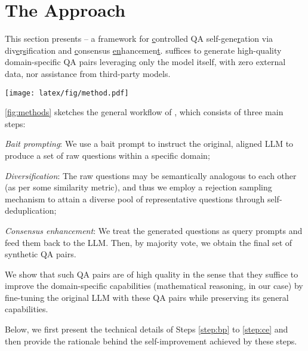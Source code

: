\section{The {\langname} Approach}

This section presents {\langname} -- %
a framework for \underline{c}ontrolled QA self-gene\underline{r}ation via div\underline{e}r\underline{s}ification and \underline{c}onsensus \underline{en}hancemen\underline{t}. {\langname} suffices to generate high-quality domain-specific QA pairs leveraging only the model itself, with zero external data, nor assistance from third-party models.

\begin{figure*}[t]
  \texttt{[image: latex/fig/method.pdf]}
  \caption{The general workflow of {\langname} in mathematical reasoning.}
  \label{fig:methods}
\end{figure*}

\cref{fig:methods} sketches the general workflow of {\langname}, which consists of three main steps:
\begin{enumerate*}[label=(\Roman*)]
    \item \emph{Bait prompting}: We use a bait prompt to instruct the original, aligned LLM to produce a set of raw questions within a specific domain;\label{step:bp}
    \item \emph{Diversification}: The raw questions may be semantically analogous to each other (as per some similarity metric), and thus we employ a rejection sampling mechanism to attain a diverse pool of representative questions through self-deduplication;\label{step:rs}
    \item \emph{Consensus enhancement}: We treat the generated questions as query prompts and feed them back to the LLM. Then, by majority vote, we obtain the final set of synthetic QA pairs.\label{step:ce}
\end{enumerate*}
We show that such QA pairs are of high quality in the sense that they suffice to improve the domain-specific capabilities (mathematical reasoning, in our case) by fine-tuning the original LLM with these QA pairs while preserving its general capabilities.

Below, we first present the technical details of Steps \ref{step:bp} to \ref{step:ce} and then provide the rationale behind the self-improvement achieved by these steps.


